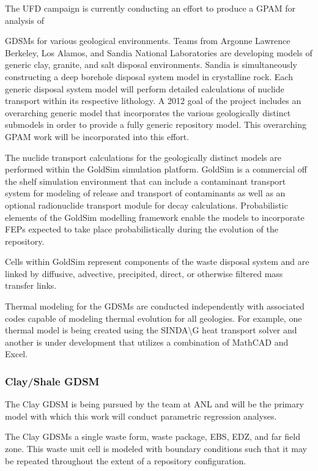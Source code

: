 The \gls{UFD} campaign is currently conducting an effort to produce
a \acrlong{GPAM} for analysis of {\glspl{GDSM} for various geological environments. Teams from Argonne
Lawrence Berkeley, Los Alamos, and Sandia National Laboratories are developing
models of generic clay, granite, and salt disposal environments. Sandia is
simultaneously constructing a deep borehole disposal system model in crystalline 
rock. Each generic disposal system model will perform detailed calculations of 
nuclide transport within its respective lithology. A 2012 goal of the 
project includes an overarching generic model that incorporates the various 
geologically distinct submodels in order to provide a fully generic repository 
model. This overarching \gls{GPAM} work will be incorporated into this effort.

The nuclide transport calculations for the geologically distinct models 
are performed within the GoldSim simulation platform. GoldSim is a commercial
off the shelf simulation environment that can include a contaminant transport 
system for modeling of release and transport of contaminants as well as an 
optional radionuclide transport module for decay calculations. 
Probabilistic elements of the GoldSim modelling framework enable the models to 
incorporate \gls{FEPs} expected to take place probabilistically during the 
evolution of the repository.  

Cells within GoldSim represent components of the waste disposal system and
are linked by diffusive, advective, precipited, direct, or  otherwise filtered
mass transfer links. 

Thermal modeling for the \glspl{GDSM} are conducted independently with 
associated codes capable of modeling thermal evolution for all geologies. For 
example, one thermal model is being created using the SINDA\textbackslash G heat
transport solver and another is under development that utilizes a combination 
of MathCAD and Excel. 

\subsubsection{Clay/Shale GDSM}

The Clay \gls{GDSM} is being pursued by the team at \gls{ANL} and will be 
the primary model with which this work will conduct parametric regression 
analyses. 

The Clay \glspl{GDSM} a single waste form, waste package, \gls{EBS}, 
\gls{EDZ}, and far field zone. This waste unit cell is modeled with boundary 
conditions such that it may be repeated throughout the extent of a repository 
configuration. 

}
